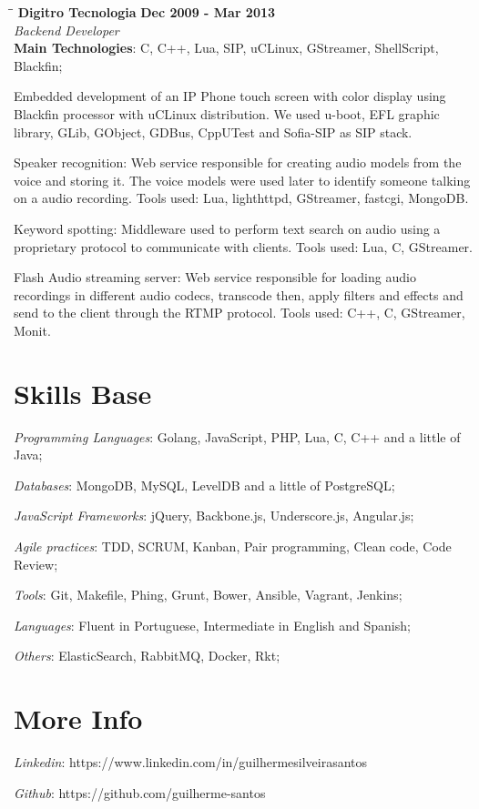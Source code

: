 \documentclass[margin]{res}
\begin{document}
\begin{resume}
\vspace{-0.1in}
    \begin{tabbing}
    \hspace{2.3in}\= \hspace{1.7in}\= \kill
    \textbf{Digitro Tecnologia}    \>\>\textbf{Dec 2009 - Mar 2013}\\
    \textit{Backend Developer}\\
    \textbf{Main Technologies}: C, C++, Lua, SIP, uCLinux, GStreamer, ShellScript, Blackfin;
    \end{tabbing}\vspace{-20pt}
    \vspace{2mm}
Embedded development of an IP Phone touch screen with color display using Blackfin processor with uCLinux distribution. We used u-boot, EFL graphic library, GLib, GObject, GDBus, CppUTest and Sofia-SIP as SIP stack.
    
Speaker recognition: Web service responsible for creating audio models from the voice and storing it. The voice models were used later to identify someone talking on a audio recording. Tools used: Lua, lighthttpd, GStreamer, fastcgi, MongoDB.

Keyword spotting: Middleware used to perform text search on audio using a proprietary protocol to communicate with clients. Tools used: Lua, C, GStreamer.

Flash Audio streaming server: Web service responsible for loading audio recordings in different audio codecs, transcode then, apply filters and effects and send to the client through the RTMP protocol. Tools used: C++, C, GStreamer, Monit.

\section{Skills Base} \textit{Programming Languages}: Golang, JavaScript, PHP, Lua, C, C++ and a little of Java;

	\textit{Databases}: MongoDB, MySQL, LevelDB and a little of PostgreSQL;
	
	\textit{JavaScript Frameworks}: jQuery, Backbone.js, Underscore.js, Angular.js;

	\textit{Agile practices}: TDD, SCRUM, Kanban, Pair programming, Clean code, Code Review;
	
	\textit{Tools}: Git, Makefile, Phing, Grunt, Bower, Ansible, Vagrant, Jenkins;
	
	\textit{Languages}: Fluent in Portuguese, Intermediate in English and Spanish;
	
	\textit{Others}: ElasticSearch, RabbitMQ, Docker, Rkt;

\section{More Info} \textit{Linkedin}: https://www.linkedin.com/in/guilhermesilveirasantos

    \textit{Github}: https://github.com/guilherme-santos

\end{resume}
\end{document}
